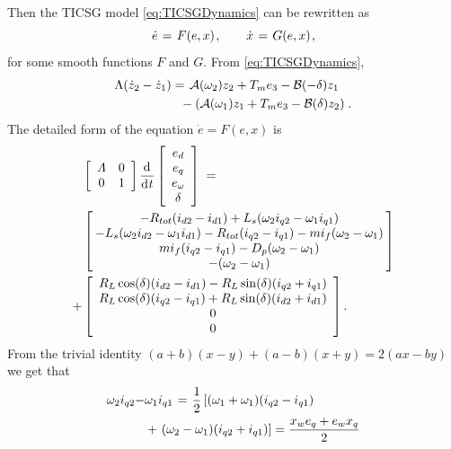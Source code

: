 \documentclass[letterpaper, 10 pt, conference]{ieeeconf}
\renewcommand{\L}    {{\Lambda}}
\renewcommand{\o}    {{\omega}}
\newcommand{\half}   {{\frac{1}{2}}}
\newcommand{\m}      {{\hbox{\hskip 1pt}}}
\newcommand{\nm}     {{\hbox{\hskip -3pt}}}
\newcommand{\dd}     {{\rm d\hbox{\hskip 0.5pt}}}
\newcommand{\Amscr}  {{\mathcal{A}}}
\newcommand{\Bmscr}  {{\mathcal{B}}}
\begin{document}
Then the TICSG model \eqref{eq:TICSGDynamics} can be rewritten as
\begin{equation} \label{eq:sync_sestem}
   \dot{e} \m=\m F(e,x) \m,\qquad \dot{x} \m=\m G(e,x) \m,
\end{equation}
for some smooth functions $F$ and $G$. From 
\eqref{eq:TICSGDynamics}, 
$$ \begin{aligned} \L(\dot{z}_2-\dot{z}_1) &=\m \Amscr(\o_2) z_2 + 
   T_m e_3-\Bmscr(-\delta)z_1\\ &\ \ -\left(\Amscr(\o_1)z_1+T_m 
   e_3-\Bmscr(\delta)z_2\right) \m.\end{aligned}$$
The detailed form of the equation $\dot e=F(e,x)$ is
$$ \begin{aligned} & \left[\begin{array}{cc} \varLambda & 0\\ 0 & 
   1 \end{array}\right] \frac{\dd}{\dd t}\left[\begin{array}{c}
   e_d\\ e_q\\ e_\o\\ \delta\end{array}\right] \m= \\ & \left[\nm
   \begin{array}{c} -R_{tot}(i_{d2}-i_{d1})+L_s(\o_2 i_{q2}-
   \o_1 i_{q1})\\ -L_s(\o_2 i_{d2}-\o_1 i_{d1})-R_{tot} (i_{q2}
   -i_{q1})-mi_f(\o_2-\o_1)\\ mi_f(i_{q2}-i_{q1})-D_p(\o_2-\o_1)
   \\ -(\o_2-\o_1) \end{array}\nm\right]\\ + & \left[\begin{array}
   {c} R_L\cos(\delta)(i_{d2}-i_{d1})-R_L\sin(\delta)(i_{q2}
   +i_{q1})\\ R_L\cos(\delta)(i_{q2}-i_{q1})+R_L\sin(\delta)(i_{d2}
   +i_{d1})\\ 0\\ 0 \end{array}\right]. \end{aligned}$$
From the trivial identity \m $(a+b)(x-y)+(a-b)(x+y)=2(ax-by)$ we
get that \vspace{-2mm}
$$ \begin{aligned} \o_2 i_{q2} -& \o_1 i_{q1} \m=\m \half\left[
   (\o_1+\o_1)(i_{q2}-i_{q1}) \right.\\ &+ \left. (\o_2-\o_1)(i_{q2}
   +i_{q1})\right] = \frac{x_{w} e_q+e_w x_q}{2} \end{aligned}$$
\end{document}
